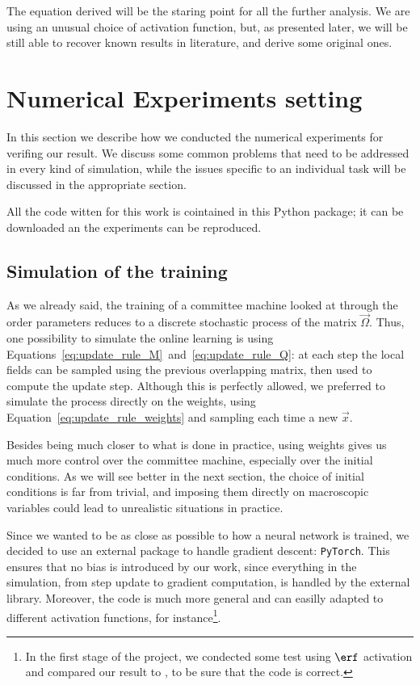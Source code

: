 The equation derived will be the staring point for all the further analysis.
We are using an unusual choice of activation function, but, as presented later,
we will be still able to recover known results in literature, and derive some original
ones.





\section{Numerical Experiments setting}
In this section we describe how we conducted the numerical experiments for verifing 
our result. We discuss some common problems that need to be addressed in every kind of simulation,
while the issues specific to an individual task will be discussed in the appropriate section.

All the code witten for this work is cointained in this Python package;
it can be downloaded an the experiments can be reproduced.

\subsection{Simulation of the training}
As we already said, the training of a committee machine looked at through the order parameters
reduces to a discrete stochastic process of the matrix \(\vec{\Omega}\). Thus, one possibility
to simulate the online learning is using Equations~\eqref{eq:update_rule_M}~and~\eqref{eq:update_rule_Q}:
at each step the local fields can be sampled using the previous overlapping matrix, then
used to compute the update step. Although this is perfectly allowed, we preferred
to simulate the process directly on the weights, using Equation~\eqref{eq:update_rule_weights}
and sampling each time a new \(\vec{x}\).

Besides being much closer to what is done in practice, using weights gives us much more control over
the committee machine, especially over the initial conditions. 
As we will see better in the next section, the choice of initial conditions is far from trivial,
and imposing them directly on macroscopic variables could lead to unrealistic situations in practice.

Since we wanted to be as close as possible to how a neural network is trained,
we decided to use an external package to handle gradient descent: \texttt{PyTorch}\cite{pytorch2019}.
This ensures that no bias is introduced by our work, since everything in the simulation,
from step update to gradient computation, is handled by the external library.
Moreover, the code is much more general and can easilly adapted to different activation
functions, for instance\footnote{
    In the first stage of the project, we condected some test using \(\erf\) activation and compared
    our result to \cite{veiga2022phase}, to be sure that the code is correct.
}.

